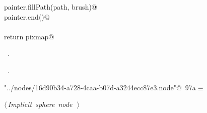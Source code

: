 \documentclass[
    a4paper,      %
    10pt,         %
    openright,    %
    notitlepage,  %
    parskip=half, %
]{scrreprt}       %
\theoremstyle{definition}                    %
\begin{document}
\begin{flushleft}
\begin{minipage}{\linewidth}
\begin{list}{}{}
\mbox{}\lstinline@    painter.fillPath(path, brush)@\\
\mbox{}\lstinline@    painter.end()@\\
\mbox{}\lstinline@@\\
\mbox{}\lstinline@    return pixmap@\\
\mbox{}\lstinline@@{\NWsep}
\end{list}
\vspace{-1.5ex}
\footnotesize
\begin{list}{}{\setlength{\itemsep}{-\parsep}\setlength{\itemindent}{-\leftmargin}}
\item \NWtxtMacroDefBy\ .
\item \NWtxtMacroRefIn\ .

\item{}
\end{list}
\end{minipage}\vspace{4ex}
\end{flushleft}
\begin{flushleft} \small
\begin{minipage}{\linewidth}\label{scrap159}\raggedright\small
{} \verb@"../nodes/16d90b34-a728-4caa-b07d-a3244ecc87e3.node"@\nobreak\ {\footnotesize {97a}}$\equiv$
\vspace{-1ex}
\begin{list}{}{} \item
\mbox{}\lstinline@@\hbox{$\langle\,${\itshape Implicit sphere node}\nobreak\ {\footnotesize {}}$\,\rangle$}\lstinline@@{\NWsep}
\end{list}
\vspace{-1.5ex}
\footnotesize
\begin{list}{}{\setlength{\itemsep}{-\parsep}\setlength{\itemindent}{-\leftmargin}}

\item{}
\end{list}
\end{minipage}\vspace{4ex}
\end{flushleft}
\end{document}
